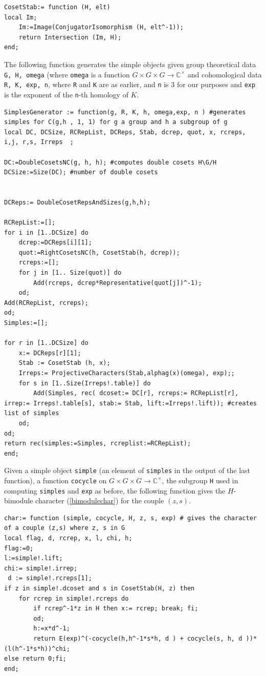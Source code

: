 \documentclass[11pt]{book}
\theoremstyle{Rem}
\theoremstyle{definition}
\numberwithin{equation}{section}
\newcommand\lstl{\lstinline}
\newcommand\CC{\mathbb C}
\newcommand{\ra}\rightarrow
\begin{document}
\begin{lstlisting}
CosetStab:= function (H, elt)
local Im;
	Im:=Image(ConjugatorIsomorphism (H, elt^-1));
	return Intersection (Im, H);	
end;	
\end{lstlisting}
The following function generates the simple objects given group theoretical data \lstl{G, H, omega} (where \lstl{omega} is a function $G\times G \times G \ra \CC^\times$ and cohomological data \lstl{R, K, exp, n}, where \lstl{R} and \lstl{K} are as earlier, and \lstl{n} is 3 for our purposes and \lstl{exp} is the exponent of the \lstl{n}-th homology of $K$.
\begin{lstlisting}
SimplesGenerator := function(g, R, K, h, omega,exp, n ) #generates simples for C(g,h , 1, 1) for g a group and h a subgroup of g
local DC, DCSize, RCRepList, DCReps, Stab, dcrep, quot, x, rcreps, i,j, r,s, Irreps  ;

DC:=DoubleCosetsNC(g, h, h); #computes double cosets H\G/H
DCSize:=Size(DC); #number of double cosets


DCReps:= DoubleCosetRepsAndSizes(g,h,h);

RCRepList:=[]; 
for i in [1..DCSize] do
	dcrep:=DCReps[i][1];
	quot:=RightCosetsNC(h, CosetStab(h, dcrep));
	rcreps:=[];
	for j in [1.. Size(quot)] do
		Add(rcreps, dcrep*Representative(quot[j])^-1);
	od;
Add(RCRepList, rcreps);
od;
Simples:=[];

for r in [1..DCSize] do
	x:= DCReps[r][1];
	Stab := CosetStab (h, x);
	Irreps:= ProjectiveCharacters(Stab,alphag(x)(omega), exp);;
	for s in [1..Size(Irreps!.table)] do
		Add(Simples, rec( dcoset:= DC[r], rcreps:= RCRepList[r], irrep:= Irreps!.table[s], stab:= Stab, lift:=Irreps!.lift)); #creates list of simples
	od;
od;
return rec(simples:=Simples, rcreplist:=RCRepList);
end;
\end{lstlisting}
Given a simple object \lstl{simple} (an element of \lstl{simples} in the output of the last function), a function \lstl{cocycle} on $G\times G \times G\ra \CC^\times$, the subgroup \lstl{H} used in computing \lstl{simples} and \lstl{exp}  as before, the following function gives the $H$-bimodule character (\ref{bimodulechar}) for the couple $(z, s)$.
\begin{lstlisting}
char:= function (simple, cocycle, H, z, s, exp) # gives the character of a couple (z,s) where z, s in G
local flag, d, rcrep, x, l, chi, h;
flag:=0;
l:=simple!.lift;
chi:= simple!.irrep;
 d := simple!.rcreps[1];
if z in simple!.dcoset and s in CosetStab(H, z) then 
	for rcrep in simple!.rcreps do
		if rcrep^-1*z in H then x:= rcrep; break; fi;
		od;
		h:=x*d^-1;
		return E(exp)^(-cocycle(h,h^-1*s*h, d ) + cocycle(s, h, d ))*(l(h^-1*s*h))^chi; 
else return 0;fi;
end;
\end{lstlisting}
\end{document}
